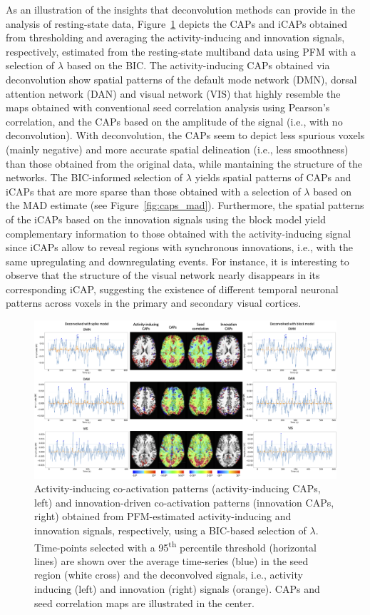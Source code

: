 As an illustration of the insights that deconvolution methods can provide in the analysis of resting-state data, Figure~\ref{fig:caps} depicts the CAPs and iCAPs obtained from thresholding and averaging the activity-inducing and innovation signals, respectively, estimated from the resting-state multiband data using PFM with a selection of $\lambda$ based on the BIC. The activity-inducing CAPs obtained via deconvolution show spatial patterns of the default mode network (DMN), dorsal attention network (DAN) and visual network (VIS) that highly resemble the maps obtained with conventional seed correlation analysis using Pearson's correlation, and the CAPs based on the amplitude of the signal (i.e., with no deconvolution). With deconvolution, the CAPs seem to depict less spurious voxels (mainly negative) and more accurate spatial delineation (i.e., less smoothness) than those obtained from the original data, while mantaining the structure of the networks. The BIC-informed selection of $\lambda$ yields spatial patterns of CAPs and iCAPs that are more sparse than those obtained with a selection of $\lambda$ based on the MAD estimate (see Figure~\ref{fig:caps_mad}). Furthermore, the spatial patterns of the iCAPs based on the innovation signals using the block model yield complementary information to those obtained with the activity-inducing signal since iCAPs allow to reveal regions with synchronous innovations, i.e., with the same upregulating and downregulating events. For instance, it is interesting to observe that the structure of the visual network nearly disappears in its corresponding iCAP, suggesting the existence of different temporal neuronal patterns across voxels in the primary and secondary visual cortices. 

\begin{figure}[t!]
    \begin{center}
        \includegraphics[width=\textwidth]{figures/caps.png}
    \end{center}
    \caption{Activity-inducing co-activation patterns (activity-inducing CAPs, left) and innovation-driven co-activation patterns (innovation CAPs, right) obtained from PFM-estimated activity-inducing and innovation signals, respectively, using a BIC-based selection of $\lambda$. Time-points selected with a 95\textsuperscript{th} percentile threshold (horizontal lines) are shown over the average time-series (blue) in the seed region (white cross) and the deconvolved signals, i.e., activity inducing (left) and innovation (right) signals (orange). CAPs and seed correlation maps are illustrated in the center.}
\label{fig:caps}
\end{figure}